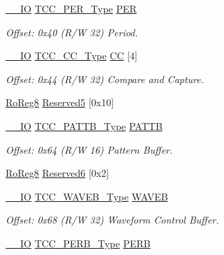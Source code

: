 \begin{DoxyCompactItemize}
\mbox{\hyperlink{core__cm0plus_8h_aec43007d9998a0a0e01faede4133d6be}{\+\_\+\+\_\+\+IO}} \mbox{\hyperlink{union_t_c_c___p_e_r___type}{T\+C\+C\+\_\+\+P\+E\+R\+\_\+\+Type}} \mbox{\hyperlink{struct_tcc_a2a7c4d62153e1e55dcb754b1c9145729}{P\+ER}}
\begin{DoxyCompactList}\small\item\em Offset\+: 0x40 (R/W 32) Period. \end{DoxyCompactList}\item 
\mbox{\hyperlink{core__cm0plus_8h_aec43007d9998a0a0e01faede4133d6be}{\+\_\+\+\_\+\+IO}} \mbox{\hyperlink{union_t_c_c___c_c___type}{T\+C\+C\+\_\+\+C\+C\+\_\+\+Type}} \mbox{\hyperlink{struct_tcc_af4049bf3c19020ebf9dfbeaeca03d6ed}{CC}} \mbox{[}4\mbox{]}
\begin{DoxyCompactList}\small\item\em Offset\+: 0x44 (R/W 32) Compare and Capture. \end{DoxyCompactList}\item 
\mbox{\hyperlink{group___s_a_m_d21_e15_a__definitions_ga0d957f1433aaf5d70e4dc2b68288442d}{Ro\+Reg8}} \mbox{\hyperlink{struct_tcc_a2d9b47c3fd63e946e1e94e1a64ebf163}{Reserved5}} \mbox{[}0x10\mbox{]}
\item 
\mbox{\hyperlink{core__cm0plus_8h_aec43007d9998a0a0e01faede4133d6be}{\+\_\+\+\_\+\+IO}} \mbox{\hyperlink{union_t_c_c___p_a_t_t_b___type}{T\+C\+C\+\_\+\+P\+A\+T\+T\+B\+\_\+\+Type}} \mbox{\hyperlink{struct_tcc_a4df130a533cfdea3d0a85621aeebe247}{P\+A\+T\+TB}}
\begin{DoxyCompactList}\small\item\em Offset\+: 0x64 (R/W 16) Pattern Buffer. \end{DoxyCompactList}\item 
\mbox{\hyperlink{group___s_a_m_d21_e15_a__definitions_ga0d957f1433aaf5d70e4dc2b68288442d}{Ro\+Reg8}} \mbox{\hyperlink{struct_tcc_acb4c89ce95041141d5c215027bd15bb1}{Reserved6}} \mbox{[}0x2\mbox{]}
\item 
\mbox{\hyperlink{core__cm0plus_8h_aec43007d9998a0a0e01faede4133d6be}{\+\_\+\+\_\+\+IO}} \mbox{\hyperlink{union_t_c_c___w_a_v_e_b___type}{T\+C\+C\+\_\+\+W\+A\+V\+E\+B\+\_\+\+Type}} \mbox{\hyperlink{struct_tcc_a64d27160396a5a9232b4d13e0c72a632}{W\+A\+V\+EB}}
\begin{DoxyCompactList}\small\item\em Offset\+: 0x68 (R/W 32) Waveform Control Buffer. \end{DoxyCompactList}\item 
\mbox{\hyperlink{core__cm0plus_8h_aec43007d9998a0a0e01faede4133d6be}{\+\_\+\+\_\+\+IO}} \mbox{\hyperlink{union_t_c_c___p_e_r_b___type}{T\+C\+C\+\_\+\+P\+E\+R\+B\+\_\+\+Type}} \mbox{\hyperlink{struct_tcc_a7a37803958084cd2f8c4b5ca00739173}{P\+E\+RB}}

\end{DoxyCompactItemize}
